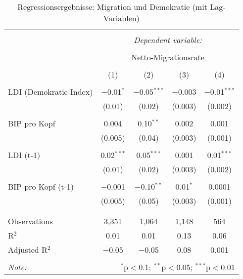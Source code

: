 
\begin{table}[!htbp] \centering 
  \caption{Regressionsergebnisse: Migration und Demokratie (mit Lag-Variablen)} 
  \label{} 
\scriptsize 
\begin{tabular}{@{\extracolsep{2pt}}lcccc} 
\\[-1.8ex]\hline 
\hline \\[-1.8ex] 
 & \multicolumn{4}{c}{\textit{Dependent variable:}} \\ 
\cline{2-5} 
\\[-1.8ex] & \multicolumn{4}{c}{Netto-Migrationsrate} \\ 
\\[-1.8ex] & (1) & (2) & (3) & (4)\\ 
\hline \\[-1.8ex] 
 LDI (Demokratie-Index) & $-$0.01$^{*}$ & $-$0.05$^{***}$ & $-$0.003 & $-$0.01$^{***}$ \\ 
  & (0.01) & (0.02) & (0.003) & (0.002) \\ 
  & & & & \\ 
 BIP pro Kopf & 0.004 & 0.10$^{**}$ & 0.002 & 0.001 \\ 
  & (0.005) & (0.04) & (0.003) & (0.001) \\ 
  & & & & \\ 
 LDI (t-1) & 0.02$^{***}$ & 0.05$^{***}$ & 0.001 & 0.01$^{***}$ \\ 
  & (0.01) & (0.02) & (0.003) & (0.002) \\ 
  & & & & \\ 
 BIP pro Kopf (t-1) & $-$0.001 & $-$0.10$^{**}$ & 0.01$^{*}$ & 0.0001 \\ 
  & (0.005) & (0.05) & (0.003) & (0.001) \\ 
  & & & & \\ 
\hline \\[-1.8ex] 
Observations & 3,351 & 1,064 & 1,148 & 564 \\ 
R$^{2}$ & 0.01 & 0.01 & 0.13 & 0.06 \\ 
Adjusted R$^{2}$ & $-$0.05 & $-$0.05 & 0.08 & 0.001 \\ 
\hline 
\hline \\[-1.8ex] 
\textit{Note:}  & \multicolumn{4}{r}{$^{*}$p$<$0.1; $^{**}$p$<$0.05; $^{***}$p$<$0.01} \\ 
\end{tabular} 
\end{table} 
